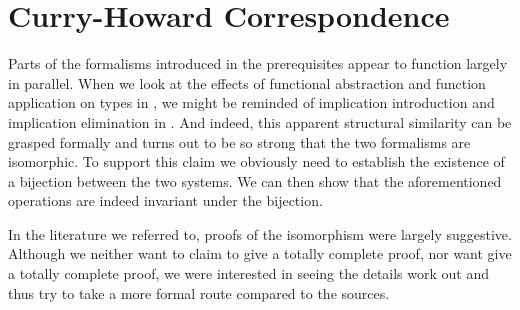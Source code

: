 \chapter{Curry-Howard Correspondence}

Parts of the formalisms introduced in the prerequisites appear to function
largely in parallel. When we look at the effects of functional abstraction and
function application on types in \stlambda, we might be reminded of implication
introduction and implication elimination in \implnpi. And indeed, this apparent
structural similarity can be grasped formally and turns out to be so strong that
the two formalisms are isomorphic. To support this claim we obviously need to
establish the existence of a bijection between the two systems. We can then show
that the aforementioned operations are indeed invariant under the bijection.

In the literature we referred to, proofs of the isomorphism were largely
suggestive. Although we neither want to claim to give a totally complete proof,
nor want give a totally complete proof, we were interested in seeing the details
work out and thus try to take a more formal route compared to the sources.






